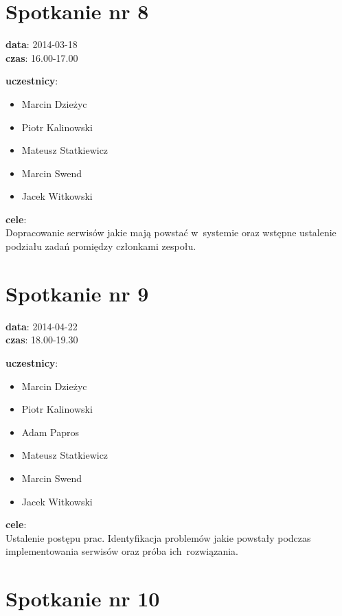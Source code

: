 \section[Spotkanie nr 8][Spotkanie nr 8]{Spotkanie nr 8}

\noindent
\textbf{data}: 2014-03-18 \\
\textbf{czas}: 16.00-17.00

\vspace{5mm}
\noindent
\textbf{uczestnicy}:
\begin{itemize}
	\item Marcin Dzieżyc
	\item Piotr Kalinowski
	\item Mateusz Statkiewicz
	\item Marcin Swend
	\item Jacek Witkowski
\end{itemize}

\vspace{5mm}
\noindent
\textbf{cele}: \\
Dopracowanie serwisów jakie mają powstać w~systemie oraz wstępne ustalenie
podziału zadań pomiędzy członkami zespołu.

\section[Spotkanie nr 9][Spotkanie nr 9]{Spotkanie nr 9}

\noindent
\textbf{data}: 2014-04-22 \\
\textbf{czas}: 18.00-19.30

\vspace{5mm}
\noindent
\textbf{uczestnicy}:
\begin{itemize}
	\item Marcin Dzieżyc
	\item Piotr Kalinowski
	\item Adam Papros
	\item Mateusz Statkiewicz
	\item Marcin Swend
	\item Jacek Witkowski
\end{itemize}

\vspace{5mm}
\noindent
\textbf{cele}: \\
Ustalenie postępu prac. Identyfikacja problemów jakie powstały podczas
implementowania serwisów oraz próba ich~rozwiązania.

\section[Spotkanie nr 10][Spotkanie nr 10]{Spotkanie nr 10}

